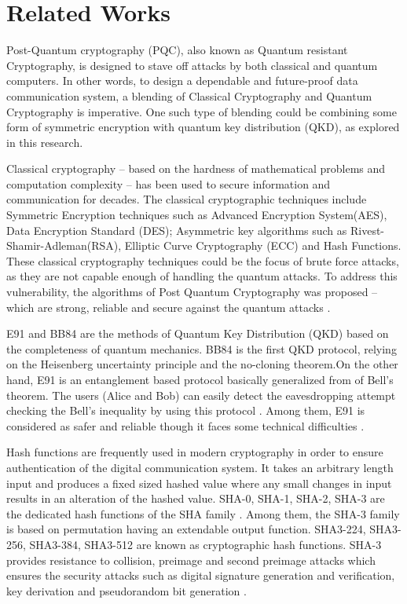 \documentclass[a4paper]{cas-sc}
\begin{document}
\section{Related Works}
\label{sec:relatedWorks}
Post-Quantum cryptography (PQC), also known as Quantum resistant Cryptography, is designed to stave off attacks
by both classical and quantum computers. In other words, to design a dependable and future-proof data communication
system, a blending of Classical Cryptography and Quantum Cryptography is imperative. One such type of blending
could be combining some form of symmetric encryption with quantum key distribution (QKD), as explored in this research.

Classical cryptography -- based on the hardness of mathematical problems and computation complexity -- has been used to secure information and communication for decades. The classical cryptographic techniques include Symmetric Encryption techniques such as Advanced Encryption System(AES), Data Encryption Standard (DES); Asymmetric key algorithms such as Rivest-Shamir-Adleman(RSA), Elliptic Curve Cryptography (ECC) and Hash Functions. These classical cryptography techniques could be the focus of brute force attacks, as they are not capable enough of handling the quantum attacks. To address this vulnerability, the algorithms of Post Quantum Cryptography was proposed -- which are strong, reliable and secure against the quantum attacks \cite{sharma2023post}.

E91 and BB84 are the methods of Quantum Key Distribution (QKD) based on the completeness of quantum mechanics. BB84 is the first QKD protocol, relying on the Heisenberg uncertainty principle and the no-cloning theorem.On the other hand, E91 is an entanglement based protocol basically generalized from of Bell's theorem. The users (Alice and Bob) can easily detect the eavesdropping attempt checking the Bell's inequality by using this protocol \cite{Ekert1991}. Among them, E91 is considered as safer and reliable though it faces some technical difficulties \cite{alvarez2016comparison}.

Hash functions are frequently used in modern cryptography in order to ensure authentication of the digital communication system. It takes an arbitrary length input and produces a fixed sized hashed value where any small changes in input results in an alteration of the hashed value. SHA-0, SHA-1, SHA-2, SHA-3 are the dedicated hash functions of the SHA family \cite{madhuravani2013cryptographic}. Among them, the SHA-3 family is based on permutation having an extendable output function. SHA3-224, SHA3-256, SHA3-384, SHA3-512 are known as cryptographic hash functions. SHA-3 provides resistance to collision, preimage and second preimage attacks which ensures the security attacks such as digital signature generation and verification, key derivation and pseudorandom bit generation  \cite{dworkin2015sha}.
\end{document}
